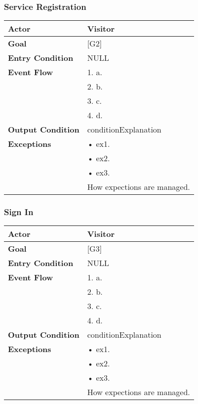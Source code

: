 \subsubsection{Service Registration}
\begin{tabular}{| l | p{8cm} |}
\hline
\textbf{Actor}      &       Visitor \\
\hline
\textbf{Goal}       &       [G2]\\
\hline
\textbf{Entry Condition} &  NULL\\
\hline
\textbf{Event Flow}     &   1.	a.\\&
                                            2.	b.\\&
                                            3.	c.\\&
                                            4.  d.\\
\hline
\textbf{Output Condition} & conditionExplanation\\
\hline
\textbf{Exceptions} &       •   ex1.\\& 
                            •	ex2.\\&
                            •	ex3.\\& 
                           How expections are managed.\\
\hline
\end{tabular} 


\subsubsection{Sign In}
\begin{tabular}{| l | p{8cm} |}
\hline
\textbf{Actor}      &       Visitor \\
\hline
\textbf{Goal}       &       [G3]\\
\hline
\textbf{Entry Condition} &  NULL\\
\hline
\textbf{Event Flow}     &   1.	a.\\&
                                            2.	b.\\&
                                            3.	c.\\&
                                            4.  d.\\
\hline
\textbf{Output Condition} & conditionExplanation\\
\hline
\textbf{Exceptions} &       •   ex1.\\& 
                            •	ex2.\\&
                            •	ex3.\\& 
                           How expections are managed.\\
\hline
\end{tabular} 


